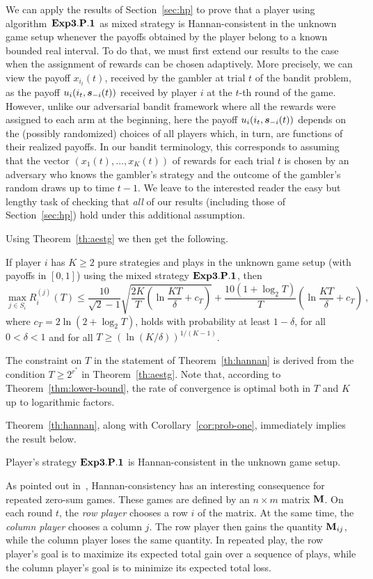 \documentclass[12pt]{article}
\newcommand{\Aestg}{{\bf Exp3.P.1}}
\newcommand{\x}[2]{x_{#1}({#2})}
\newcommand{\mat}{{\bf M}}
\begin{document}
We can apply the results of Section~\ref{sec:hp} to prove that a player
using algorithm~$\Aestg$ as mixed strategy is Hannan-consistent in the
unknown game setup whenever the payoffs obtained by the player belong
to a known bounded real interval.
To do that, we must first extend our results to the case when the assignment
of rewards can be chosen adaptively. More precisely, we can view the
payoff $\x{i_t}{t}$, received by the gambler at trial $t$ of the bandit problem,
as the payoff $u_i(i_t,\mbox{\boldmath$s$}_{-i}(t))$ received by player $i$ at the $t$-th round
of the game.
However, unlike our adversarial bandit framework where all the rewards were
assigned to each arm at the beginning, here the payoff $u_i(i_t,\mbox{\boldmath$s$}_{-i}(t))$
depends on the (possibly randomized) choices of all players which, in turn,
are functions of their realized payoffs.
In our bandit terminology, this corresponds to assuming that the vector
$(\x{1}{t},\ldots,\x{K}{t})$ of rewards for each trial $t$ is chosen by an adversary
who knows the gambler's strategy and the outcome of the gambler's random draws up
to time $t-1$. We leave to the interested reader the easy but lengthy task of checking
that {\em all} of our results (including those of Section~\ref{sec:hp}) hold under
this additional assumption.

Using Theorem~\ref{th:aestg} we then get the following.
\begin{theorem}
\label{th:hannan}
If player $i$ has $K \geq 2$ pure strategies and plays in the unknown game setup
(with payoffs in $[0,1]$) using the mixed strategy $\Aestg$, then
\[
        \max_{j \in S_i} R_i^{(j)}(T)
\leq
        \frac{10}{\sqrt{2}-1}\sqrt{\frac{2K}{T}\left(\ln\frac{KT}{\delta} + c_T\right)}
        + \frac{10(1+\log_2 T)}{T}\left(\ln\frac{KT}{\delta} + c_T\right)~,
\]
where $c_T = 2\ln(2+\log_2 T)$, holds with probability at least $1-\delta$,
for all $0 < \delta < 1$ and for all $T \ge (\ln(K/\delta))^{1/(K-1)}$.
\end{theorem}
The constraint on $T$ in the statement of Theorem~\ref{th:hannan} is derived
from the condition $T \ge 2^{r^*}$ in Theorem~\ref{th:aestg}.
Note that, according to Theorem~\ref{thm:lower-bound}, the rate of convergence
is optimal both in $T$ and $K$ up to logarithmic factors.

Theorem~\ref{th:hannan}, along with Corollary~\ref{cor:prob-one}, immediately
implies the result below.
\begin{cor}
Player's strategy $\Aestg$ is Hannan-consistent in the unknown game setup.
\end{cor}
%
As pointed out in~\cite{FV97}, Hannan-consistency has an interesting consequence
for repeated zero-sum games. These games are defined by an $n\times m$ matrix $\mat$.
On each round $t$, the {\em row player} chooses a row $i$ of the matrix. At the
same time, the {\em column player} chooses a column $j$. The row player then gains
the quantity $\mat_{ij}$, while the column player loses the same quantity.
In repeated play, the row player's goal is to maximize its expected total gain
over a sequence of plays, while the column player's goal is to minimize its
expected total loss.
\end{document}
